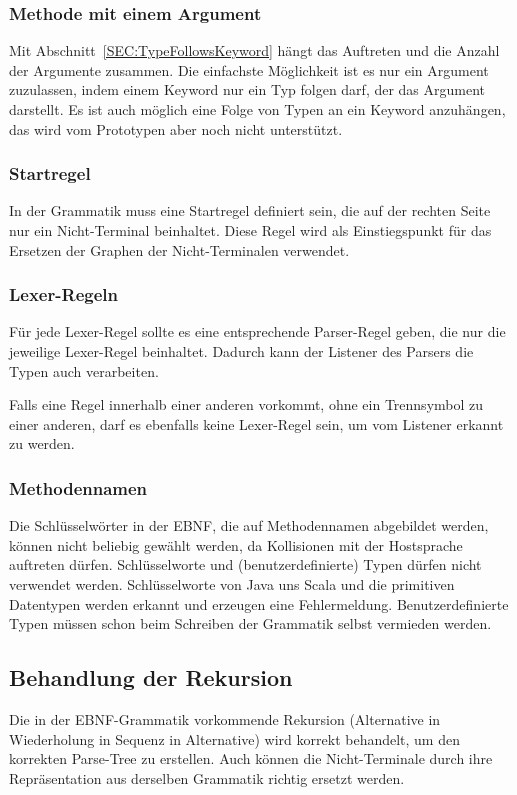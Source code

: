 \documentclass[../InterneDSLs.tex]{subfiles}
\begin{document}
\subsubsection{Methode mit einem Argument}
Mit Abschnitt~\ref{SEC:TypeFollowsKeyword} hängt das Auftreten und die Anzahl der Argumente zusammen. Die einfachste Möglichkeit ist es nur ein Argument zuzulassen, indem einem Keyword nur ein Typ folgen darf, der das Argument darstellt. Es ist auch möglich eine Folge von Typen an ein Keyword anzuhängen, das wird vom Prototypen aber noch nicht unterstützt.

\subsubsection{Startregel}
In der Grammatik muss eine Startregel definiert sein, die auf der rechten Seite nur ein Nicht-Terminal beinhaltet. Diese Regel wird als Einstiegspunkt für das Ersetzen der Graphen der Nicht-Terminalen verwendet.

\subsubsection{Lexer-Regeln}
Für jede Lexer-Regel sollte es eine entsprechende Parser-Regel geben, die nur die jeweilige Lexer-Regel beinhaltet. Dadurch kann der Listener des Parsers die Typen auch verarbeiten.

Falls eine Regel innerhalb einer anderen vorkommt, ohne ein Trennsymbol zu einer anderen, darf es ebenfalls keine Lexer-Regel sein, um vom Listener erkannt zu werden.

\subsubsection{Methodennamen}
Die Schlüsselwörter in der EBNF, die auf Methodennamen abgebildet werden, können nicht beliebig gewählt werden, da Kollisionen mit der Hostsprache auftreten dürfen. Schlüsselworte und (benutzerdefinierte) Typen dürfen nicht verwendet werden. Schlüsselworte von Java uns Scala und die primitiven Datentypen werden erkannt und erzeugen eine Fehlermeldung. Benutzerdefinierte Typen müssen schon beim Schreiben der Grammatik selbst vermieden werden.


\subsection{Behandlung der Rekursion}
Die in der EBNF-Grammatik vorkommende Rekursion (Alternative in Wiederholung in Sequenz in Alternative) wird korrekt behandelt, um den korrekten Parse-Tree zu erstellen. Auch können die Nicht-Terminale durch ihre Repräsentation aus derselben Grammatik richtig ersetzt werden.
\end{document}

